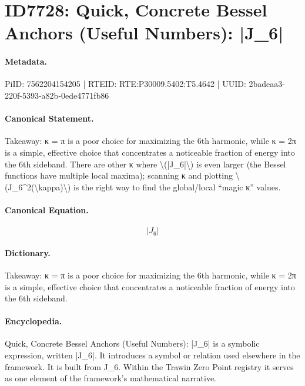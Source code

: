 \section*{ID7728: Quick, Concrete Bessel Anchors (Useful Numbers): |J\_6|}
\paragraph{Metadata.}
PiID: 7562204154205 | RTEID: RTE:P30009.5402:T5.4642 | UUID: 2badeaa3-220f-5393-a82b-0ede4771fb86

\paragraph{Canonical Statement.}
Takeaway: κ = π is a poor choice for maximizing the 6th harmonic, while κ = 2π is a simple, effective choice that concentrates a noticeable fraction of energy into the 6th sideband. There are other κ where \textbackslash{}(|J\_6|\textbackslash{}) is even larger (the Bessel functions have multiple local maxima); scanning κ and plotting \textbackslash{}(J\_6\textasciicircum{}2(\textbackslash{}kappa)\textbackslash{}) is the right way to find the global/local “magic κ” values.

\paragraph{Canonical Equation.}
\[
|J_6|
\]

\paragraph{Dictionary.}
Takeaway: κ = π is a poor choice for maximizing the 6th harmonic, while κ = 2π is a simple, effective choice that concentrates a noticeable fraction of energy into the 6th sideband.

\paragraph{Encyclopedia.}
Quick, Concrete Bessel Anchors (Useful Numbers): |J\_6| is a symbolic expression, written |J\_6|. It introduces a symbol or relation used elsewhere in the framework. It is built from J\_6. Within the Trawin Zero Point registry it serves as one element of the framework's mathematical narrative.
